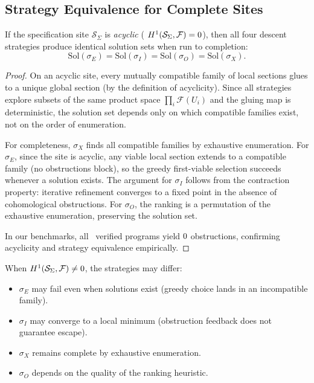 \documentclass[11pt]{article}
\newcommand{\FragmentSpace}{\mathcal{F}}
\newcommand{\SpecSpace}{\mathcal{S}_\Sigma}
\begin{document}
\subsection{Strategy Equivalence for Complete Sites}

\begin{theorem}%
\label{thm:strategy-equiv-acyclic}
If the specification site $\SpecSpace$ is \emph{acyclic} (\ie
$\Hcoh{1}(\SpecSpace, \FragmentSpace) = 0$), then all four descent
strategies produce identical solution sets when run to completion:
\[
  \mathrm{Sol}(\sigma_E) = \mathrm{Sol}(\sigma_I) =
  \mathrm{Sol}(\sigma_O) = \mathrm{Sol}(\sigma_X).
\]
\end{theorem}

\begin{proof}
On an acyclic site, every mutually compatible family of local sections
glues to a unique global section (by the definition of acyclicity).
Since all strategies explore subsets of the same product space
$\prod_i \FragmentSpace(U_i)$ and the gluing map is deterministic,
the solution set depends only on which compatible families exist,
not on the order of enumeration.

For completeness, $\sigma_X$ finds all compatible families by
exhaustive enumeration.  For $\sigma_E$, since the site is acyclic,
any viable local section extends to a compatible family (no
obstructions block), so the greedy first-viable selection succeeds
whenever a solution exists.  The argument for $\sigma_I$ follows
from the contraction property: iterative refinement converges to a
fixed point in the absence of cohomological obstructions.
For $\sigma_O$, the ranking is a permutation of the exhaustive
enumeration, preserving the solution set.

In our benchmarks, all \ppLIVverifiedCount\ verified programs
yield $0$ obstructions, confirming
acyclicity and strategy equivalence empirically.
\end{proof}

\begin{remark}\label{rem:non-acyclic}
When $\Hcoh{1}(\SpecSpace, \FragmentSpace) \neq 0$, the strategies
may differ:
\begin{itemize}[noitemsep]
  \item $\sigma_E$ may fail even when solutions exist (greedy choice
        lands in an incompatible family).
  \item $\sigma_I$ may converge to a local minimum (obstruction
        feedback does not guarantee escape).
  \item $\sigma_X$ remains complete by exhaustive enumeration.
  \item $\sigma_O$ depends on the quality of the ranking heuristic.
\end{itemize}
\end{remark}
\end{document}
